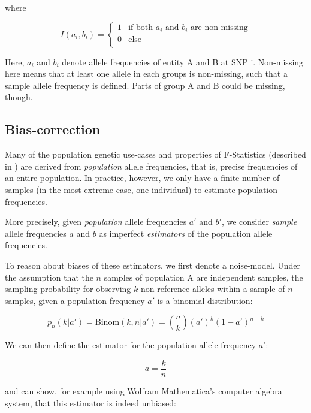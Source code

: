 \documentclass{article}
\begin{document}
where

\begin{equation}
I\left(a_i,b_i\right)=
\begin{cases}
    1 & \text{if both $a_i$ and $b_i$ are non-missing} \\
    0 & \text{else} \\
\end{cases}
\end{equation}

Here, \(a_i\) and \(b_i\) denote allele frequencies of entity A and B at SNP i. Non-missing here means that at least one allele in each groups is non-missing, such that a sample allele frequency is defined. Parts of group A and B could be missing, though.

\subsection{Bias-correction}

Many of the population genetic use-cases and properties of F-Statistics (described in \cite{Patterson2012-yq}) are derived from \textit{population} allele frequencies, that is, precise frequencies of an entire population. In practice, however, we only have a finite number of samples (in the most extreme case, one individual) to estimate population frequencies. 

More precisely, given \textit{ population }allele frequencies \(a'\) and \(b'\), we consider \textit{ sample }allele frequencies \(a\) and \(b\)
as imperfect \textit{estimators} of the population allele frequencies. 

To reason about biases of these estimators, we first denote a noise-model. Under the assumption that the \(n\) samples of population A are independent samples, the sampling probability for observing \(k\) non-reference alleles within a sample of \(n\) samples, given a population frequency \(a'\) is a binomial distribution:

\begin{equation}
p_n(k|a')=\text{Binom}(k,n|a')=\binom{n}{k}\left(a'\right)^k(1-a')^{n-k}
\end{equation}

We can then define the estimator for the population allele frequency \(a'\):

\begin{equation}
a=\frac{k}{n}
\end{equation}

and can show, for example using Wolfram Mathematica's computer algebra system, that this estimator is indeed unbiased:
\end{document}
